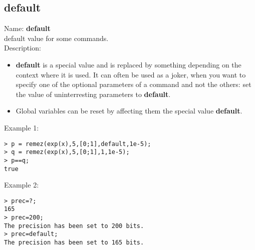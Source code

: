 \subsection{default}
\label{labdefault}
\noindent Name: \textbf{default}\\
default value for some commands.\\

\noindent Description: \begin{itemize}

\item \textbf{default} is a special value and is replaced by something depending on the 
   context where it is used. It can often be used as a joker, when you want to 
   specify one of the optional parameters of a command and not the others: set 
   the value of uninterresting parameters to \textbf{default}.

\item Global variables can be reset by affecting them the special value \textbf{default}.
\end{itemize}
\noindent Example 1: 
\begin{center}\begin{minipage}{15cm}\begin{Verbatim}[frame=single]
> p = remez(exp(x),5,[0;1],default,1e-5);
> q = remez(exp(x),5,[0;1],1,1e-5);
> p==q;
true
\end{Verbatim}
\end{minipage}\end{center}
\noindent Example 2: 
\begin{center}\begin{minipage}{15cm}\begin{Verbatim}[frame=single]
> prec=?;
165
> prec=200;
The precision has been set to 200 bits.
> prec=default;
The precision has been set to 165 bits.
\end{Verbatim}
\end{minipage}\end{center}
